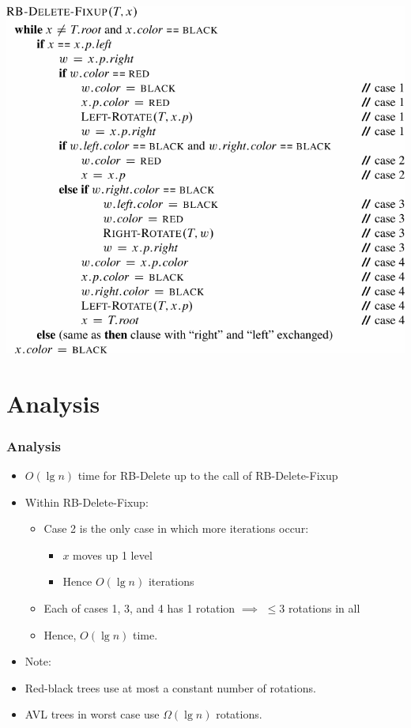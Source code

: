 \documentclass{beamer}
\newcommand{\bi}{\begin{itemize}}
\newcommand{\ii}{\item}
\newcommand{\ei}{\end{itemize}}
\newcommand{\sect}[1]{
\section{#1}
\begin{frame}[fragile]\frametitle{#1}
}
\begin{document}
\sect{}
\includegraphics[scale=0.8]{RB-Delete-Fixup}
\end{frame}

\sect{Analysis}
\bi
\ii $O(\lg n)$ time for {\sc RB-Delete} up to the call
of {\sc RB-Delete-Fixup}
\ii Within {\sc RB-Delete-Fixup}:
\bi
\ii Case 2 is the only case in which more iterations occur:
\bi
\ii $x$ moves up 1 level
\ii Hence $O(\lg n)$ iterations
\ei
\ii Each of cases 1, 3, and 4 has 1 rotation $\implies$
$\leq 3$ rotations in all
\ii Hence, $O(\lg n)$ time.
\ei
\ii Note:
\ii Red-black trees use at most a constant number of rotations.
\ii AVL trees in worst case use $\Omega(\lg n)$ rotations.
\ei
\end{frame}

\end{document}
